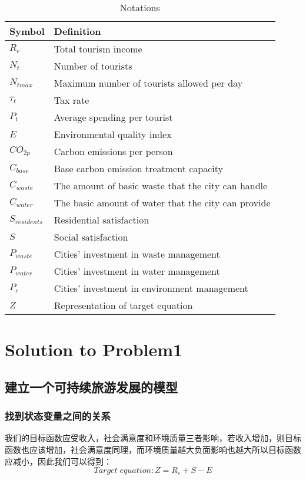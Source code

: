 \documentclass[12pt]{article}  %
\begin{document}
\begin{table}[H]
\begin{center}
\caption{Notations}
\begin{tabular}{>{\centering\arraybackslash}m{4cm} >{\centering\arraybackslash}m{10cm}}
	\toprule
		Symbol & Definition \\
	\midrule
	    \(R_{e}\) & Total tourism income \\
		\(N_{t}\) & Number of tourists \\
		\(N_{tmax}\) & Maximum number of tourists allowed per day \\
		\(\tau_{t}\) & Tax rate \\
		\(P_{t}\) & Average spending per tourist \\
		\(E\) & Environmental quality index \\
		\(CO_{2p}\) & Carbon emissions per person \\
		\(C_{base}\) & Base carbon emission treatment capacity \\
		\(C_{waste}\) & The amount of basic waste that the city can handle \\
		\(C_{water}\) & The basic amount of water that the city can provide \\
		\(S_{residents}\) & Residential satisfaction \\
		\(S\) & Social satisfaction \\
		\(P_{waste}\) & Cities' investment in waste management \\
		\(P_{water}\) & Cities' investment in water management \\
		\(P_{e}\) & Cities' investment in environment management \\
		\(Z\) & Representation of target equation\\
	\bottomrule
\end{tabular}\label{tb:notation}
\end{center}
\end{table}

\section{Solution to Problem1}
\subsection{建立一个可持续旅游发展的模型}
\subsubsection{找到状态变量之间的关系}
我们的目标函数应受收入，社会满意度和环境质量三者影响，若收入增加，则目标函数也应该增加，社会满意度同理，而环境质量越大负面影响也越大所以目标函数应减小，因此我们可以得到：
\begin{equation}
	Target\; equation:Z=R_e+S-E
\end{equation}
\end{document}
